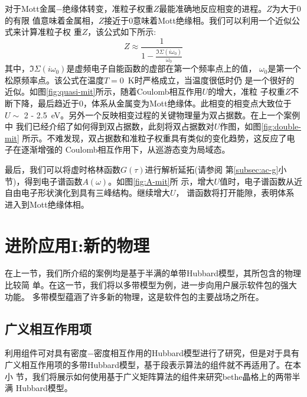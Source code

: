 对于Mott金属$-$绝缘体转变，准粒子权重$Z$最能准确地反应相变的进程。$Z$为大于0的有限
值意味着金属相，$Z$接近于0意味着Mott绝缘相。我们可以利用一个近似公式来计算准粒子权
重$Z$，该公式如下所示:
\begin{equation}
Z \approx \frac{1}{1-\frac{\Im \Sigma(i\omega_{0})}{\omega_{0}}}
\end{equation}
其中，$\Im \Sigma(i\omega_{0})$是虚频电子自能函数的虚部在第一个频率点上的值，
$\omega_{0}$是第一个松原频率点。该公式在温度$T = 0$\ K时严格成立，当温度很低时仍
是一个很好的近似。如图\ref{fig:quasi-mit}所示，随着Coulomb相互作用$U$的增大，准粒
子权重$Z$不断下降，最后趋近于0，体系从金属变为Mott绝缘体。此相变的相变点大致位于
$U \sim$ 2 - 2.5\ eV。另外一个反映相变过程的关键物理量为双占据数。在上一个案例中
我们已经介绍了如何得到双占据数，此刻将双占据数对$U$作图，如图\ref{fig:double-mit}
所示。不难发现，双占据数和准粒子权重具有类似的变化趋势，这反应了电子在逐渐增强的
Coulomb相互作用下，从巡游态变为局域态。

最后，我们可以将虚时格林函数$G(\tau)$进行解析延拓(请参阅
第\ref{subsec:ac-g}小节)，得到电子谱函数$A(\omega)$。如图\ref{fig:A-mit}所
示，增大$U$值时，电子谱函数从近自由电子形状演化到具有三峰结构。继续增大$U$，
谱函数将打开能隙，表明体系进入到Mott绝缘体相。

\section{进阶应用I:新的物理}
\label{sec:stage1}

在上一节，我们所介绍的案例均是基于半满的单带Hubbard模型，其所包含的物理比较简
单。在这一节，我们将以多带模型为例，进一步向用户展示{\iqist}软件包的强大功能。
多带模型蕴涵了许多新的物理，这是{\iqist}软件包的主要战场之所在。

\subsection{广义相互作用项}
\label{subsec:general}

利用{\azalea}组件可对具有密度$-$密度相互作用的Hubbard模型进行了研究，但是对于具有
广义相互作用项的多带Hubbard模型，基于段表示算法的{\azalea}组件就不再适用了。在本小
节，我们将展示如何使用基于广义矩阵算法的{\begonia}组件来研究bethe晶格上的两带半满
Hubbard模型。

